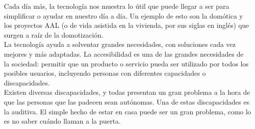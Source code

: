 Cada día más, la tecnología nos muestra lo útil que puede llegar a ser para simplificar o ayudar en nuestro día a día. Un ejemplo de esto son la domótica y los proyectos AAL (o de vida asistida en la vivienda, por sus siglas en inglés) que surgen a raíz de la domotización. \\

La tecnología ayuda a solventar grandes necesidades, con soluciones cada vez mejores y más adaptadas. La accesibilidad es una de las grandes necesidades de la sociedad: permitir que un producto o servicio pueda ser utilizado por todos los posibles usuarios, incluyendo personas con diferentes capacidades o discapacidades. \\

Existen diversas discapacidades, y todas presentan un gran problema a la hora de que las personas que las padecen sean autónomas. Una de estas discapacidades es la auditiva. El simple hecho de estar en casa puede ser un gran problema, como lo es no saber cuándo llaman a la puerta.